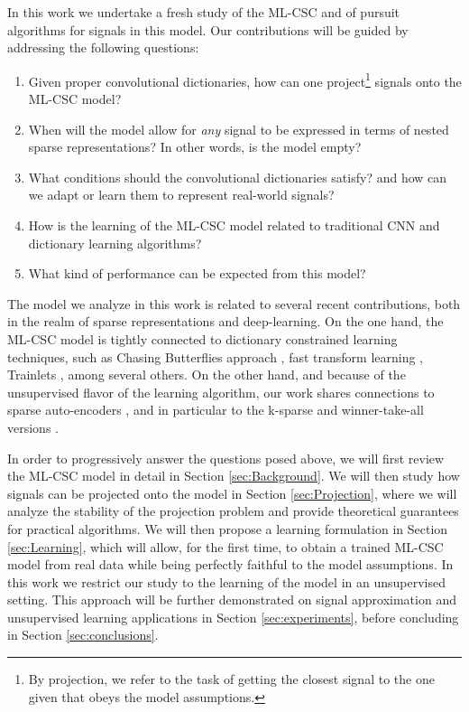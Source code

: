 \documentclass[10pt,journal]{IEEEtran}
\theoremstyle{plain}
\theoremstyle{definition}
\begin{document}
In this work we undertake a fresh study of the ML-CSC and of pursuit algorithms for signals in this model. Our contributions will be guided by addressing the following questions:

\begin{enumerate}

	\item Given proper convolutional dictionaries, how can one project\footnote{By projection, we refer to the task of getting the closest signal to the one given that obeys the model assumptions.} signals onto the ML-CSC model?

	\item When will the model allow for \emph{any} signal to be expressed in terms of nested sparse representations? In other words, is the model empty?

	\item What conditions should the convolutional dictionaries satisfy? and how can we adapt or learn them to represent real-world signals?

	\item How is the learning of the ML-CSC model related to traditional CNN and dictionary learning algorithms? 

	\item What kind of performance can be expected from this model?

\end{enumerate}

The model we analyze in this work is related to several recent contributions, both in the realm of sparse representations and deep-learning. On the one hand, the ML-CSC model is tightly connected to dictionary constrained learning techniques, such as Chasing Butterflies approach \cite{Lemagoarou15}, fast transform learning \cite{Chabiron2013}, Trainlets \cite{Sulam2016}, among several others. On the other hand, and because of the unsupervised flavor of the learning algorithm, our work shares connections to sparse auto-encoders \cite{ng2011sparse}, and in particular to the k-sparse \cite{makhzani2013k} and winner-take-all versions \cite{makhzani2015winner}.

In order to progressively answer the questions posed above, we will first review the ML-CSC model in detail in Section \ref{sec:Background}. We will then study how signals can be projected onto the model in Section \ref{sec:Projection}, where we will analyze the stability of the projection problem and provide theoretical guarantees for practical algorithms. We will then propose a learning formulation in Section \ref{sec:Learning}, which will allow, for the first time, to obtain a trained ML-CSC model from real data while being perfectly faithful to the model assumptions. In this work we restrict our study to the learning of the model in an unsupervised setting. This approach will be further demonstrated on signal approximation and unsupervised learning applications in Section \ref{sec:experiments}, before concluding in Section \ref{sec:conclusions}.
\end{document}
